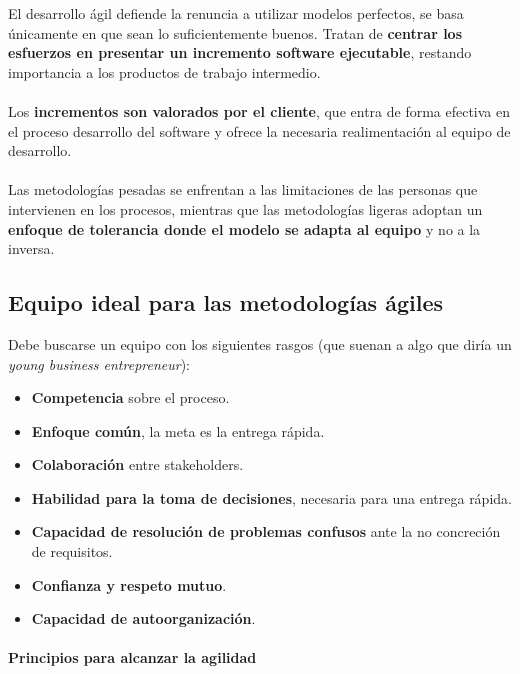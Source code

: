 El desarrollo ágil defiende la renuncia a utilizar modelos perfectos, se basa únicamente en que sean lo suficientemente buenos. Tratan de \textbf{centrar los esfuerzos en presentar un incremento software ejecutable}, restando importancia a los productos de trabajo intermedio.
\\\\
Los \textbf{incrementos son valorados por el cliente}, que entra de forma efectiva en el proceso desarrollo del software y ofrece la necesaria realimentación al equipo de desarrollo.
\\\\
Las metodologías pesadas se enfrentan a las limitaciones de las personas que intervienen en los procesos, mientras que las metodologías ligeras adoptan un \textbf{enfoque de tolerancia donde el modelo se adapta al equipo} y no a la inversa.

\subsection{Equipo ideal para las metodologías ágiles}
Debe buscarse un equipo con los siguientes rasgos (que suenan a algo que diría un \textit{young business entrepreneur}):
\begin{itemize}
   \item \textbf{Competencia} sobre el proceso.
   \item \textbf{Enfoque común}, la meta es la entrega rápida.
   \item \textbf{Colaboración} entre stakeholders.
   \item \textbf{Habilidad para la toma de decisiones}, necesaria para una entrega rápida.
   \item \textbf{Capacidad de resolución de problemas confusos} ante la no concreción de requisitos.
   \item \textbf{Confianza y respeto mutuo}. %
   \item \textbf{Capacidad de autoorganización}. %
\end{itemize}

\paragraph{Principios para alcanzar la agilidad}

